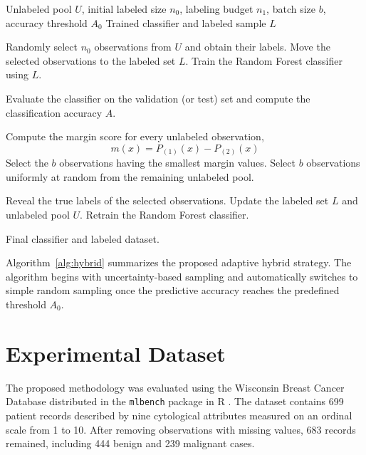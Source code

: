 \documentclass[twoside]{article}
\begin{document}
\begin{algorithm}[ht]
\caption{Adaptive Hybrid Active--Passive Learning}
\label{alg:hybrid}
\begin{algorithmic}[1]
\Require Unlabeled pool $U$, initial labeled size $n_0$, labeling budget $n_1$, batch size $b$, accuracy threshold $A_0$
\Ensure Trained classifier and labeled sample $L$

\State Randomly select $n_0$ observations from $U$ and obtain their labels.
\State Move the selected observations to the labeled set $L$.
\State Train the Random Forest classifier using $L$.


    \State Evaluate the classifier on the validation (or test) set and compute the classification accuracy $A$.

        \State Compute the margin score for every unlabeled observation,
        \[
        m(x)=P_{(1)}(x)-P_{(2)}(x)
        \]
            \State Select the $b$ observations having the smallest margin values.
    \Else
        \State Select $b$ observations uniformly at random from the remaining unlabeled pool.
    \EndIf

    \State Reveal the true labels of the selected observations.
    \State Update the labeled set $L$ and unlabeled pool $U$.
    \State Retrain the Random Forest classifier.

\EndWhile

\State \Return Final classifier and labeled dataset.
\end{algorithmic}
\end{algorithm}
Algorithm~\ref{alg:hybrid} summarizes the proposed adaptive
hybrid strategy. The algorithm begins with uncertainty-based
sampling and automatically switches to simple random sampling
once the predictive accuracy reaches the predefined threshold
$A_0$.
\section{Experimental Dataset}

The proposed methodology was evaluated using the Wisconsin Breast Cancer
Database distributed in the \texttt{mlbench} package in R
\cite{Mangasarian1990,Street1993}. The dataset contains 699 patient records
described by nine cytological attributes measured on an ordinal scale from 1 to
10. After removing observations with missing values, 683 records remained,
including 444 benign and 239 malignant cases.
\end{document}
